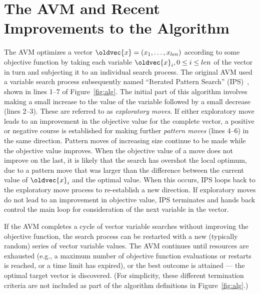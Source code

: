 \documentclass{llncs}
\let\vec\oldvec %
\newcommand{\inlineheading}[1]{\vspace{1mm} \noindent {\bf #1.}}
\begin{document}
\section{The AVM and Recent Improvements to the Algorithm}
\vspace{-1em}
\inlineheading{The original AVM} The AVM optimizes a vector $\vec{x} = (x_1, \dots, x_{len})$ according to some objective function by taking each variable $\vec{x}_i, 0 \leq i \leq len$ of the vector in turn and subjecting it to an individual search process. The original AVM used a variable search process subsequently named ``Iterated Pattern Search'' (IPS)~\cite{Kempka2015}, shown in lines 1--7 of Figure~\ref{fig:alg}. The initial part of this algorithm involves making a small increase to the value of the variable followed by a small decrease (lines 2--3). These are referred to as {\it exploratory moves}. If either exploratory move leads to an improvement in the objective value for the complete vector, a positive or negative course is established for making further {\it pattern moves} (lines 4--6) in the same direction. Pattern moves of increasing size continue to be made while the objective value improves. When the objective value of a move does not improve on the last, it is likely that the search has overshot the local optimum, due to a pattern move that was larger than the difference between the current value of $\vec{x}_i$ and the optimal value. When this occurs, IPS loops back to the exploratory move process to re-establish a new direction. If exploratory moves do not lead to an improvement in objective value, IPS terminates and hands back control the main loop for consideration of the next variable in the vector.

If the AVM completes a cycle of vector variable searches without improving the objective function, the search process can be restarted with a new (typically random) series of vector variable values.
The AVM continues until resources are exhausted (e.g., a maximum number of objective function evaluations or restarts is reached, or a time limit has expired), or the best outcome is attained --- the optimal target vector is discovered. (For simplicity, these different termination criteria are not included as part of the algorithm definitions in Figure~\ref{fig:alg}.)
\end{document}
